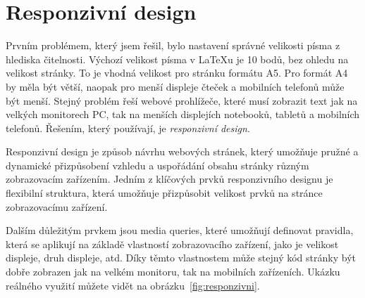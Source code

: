 \documentclass{csbulletin}
\begin{document}



\section{Responzivní design}

Prvním problémem, který jsem řešil, bylo nastavení správné velikosti písma 
z hlediska čitelnosti. 
Výchozí velikost písma v \LaTeX u je 10 bodů, bez ohledu na velikost
stránky. To je vhodná velikost pro stránku formátu A5. Pro formát
A4 by měla být větší, naopak pro menší displeje čteček a mobilních
telefonů může být menší. Stejný problém řeší webové prohlížeče,
které musí zobrazit text jak na velkých monitorech PC, tak na
menších displejích notebooků, tabletů a mobilních telefonů. 
Řešením, který používají, je \textit{responzivní design}.



Responzivní design je způsob návrhu webových stránek, který umožňuje
pružné a dynamické přizpůsobení vzhledu a uspořádání obsahu stránky
různým zobrazovacím zařízením. Jedním z klíčových prvků responzivního
designu je flexibilní struktura, která umožňuje přizpůsobit velikost
prvků na stránce zobrazovacímu zařízení.

Dalším důležitým prvkem jsou media queries, které umožňují definovat
pravidla, která se aplikují na základě vlastností zobrazovacího
zařízení, jako je velikost displeje, druh displeje, atd. Díky těmto
vlastnostem může stejný kód stránky být dobře zobrazen jak na velkém
monitoru, tak na mobilních zařízeních. Ukázku reálného využití 
můžete vidět na obrázku~\ref{fig:responzivni}.
\end{document}
